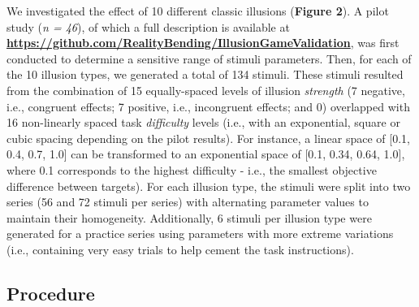 \documentclass[
  man,floatsintext]{apa6}
\begin{document}
We investigated the effect of 10 different classic illusions (\textbf{Figure 2}).
A pilot study (\emph{n = 46}), of which a full description is available at \href{https://github.com/RealityBending/IllusionGameValidation}{\textbf{https://github.com/RealityBending/IllusionGameValidation}}, was first conducted to determine a sensitive range of stimuli parameters. Then, for each of the 10 illusion types, we generated a total of 134 stimuli. These stimuli resulted from the combination of 15 equally-spaced levels of illusion \emph{strength} (7 negative, i.e., congruent effects; 7 positive, i.e., incongruent effects; and 0) overlapped with 16 non-linearly spaced task \emph{difficulty} levels (i.e., with an exponential, square or cubic spacing depending on the pilot results). For instance, a linear space of {[}0.1, 0.4, 0.7, 1.0{]} can be transformed to an exponential space of {[}0.1, 0.34, 0.64, 1.0{]}, where 0.1 corresponds to the highest difficulty - i.e., the smallest objective difference between targets). For each illusion type, the stimuli were split into two series (56 and 72 stimuli per series) with alternating parameter values to maintain their homogeneity. Additionally, 6 stimuli per illusion type were generated for a practice series using parameters with more extreme variations (i.e., containing very easy trials to help cement the task instructions).

\hypertarget{procedure}{%
\subsection{Procedure}\label{procedure}}
\end{document}
